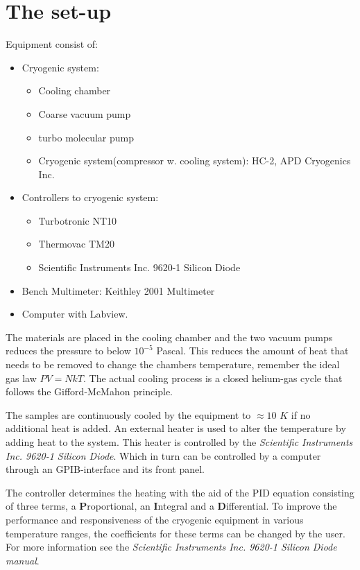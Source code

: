 \documentclass[a4paper,12pt]{article}
\begin{document}
\section{The set-up}
Equipment consist of:
\begin{itemize}
\item Cryogenic system:
\begin{itemize}
\item Cooling chamber
\item Coarse vacuum pump
\item turbo molecular pump
\item Cryogenic system(compressor w. cooling system): HC-2, APD Cryogenics Inc.
\end{itemize}
\item Controllers to cryogenic system: 
\begin{itemize}
\item Turbotronic NT10
\item Thermovac TM20
\item Scientific Instruments Inc. 9620-1 Silicon Diode
\end{itemize} 
\item Bench Multimeter: Keithley 2001 Multimeter
\item Computer with Labview.
\end{itemize}

The materials are placed in the cooling chamber and the two vacuum pumps reduces the pressure to below $10^{-5}$ Pascal. This reduces the amount of heat that needs to be removed to change the chambers temperature, remember the ideal gas law $PV=NkT$. The actual cooling process is a closed helium-gas cycle that follows the Gifford-McMahon principle.

The samples are continuously cooled by the equipment to $\approx 10$ $K$ if no additional heat is added. An external heater is used to alter the temperature by adding heat to the system. This heater is controlled by the \emph{Scientific Instruments Inc. 9620-1 Silicon Diode}. Which in turn can be controlled by a computer through an GPIB-interface and its front panel. 

The controller determines the heating with the aid of the PID equation consisting of three terms, a \textbf{P}roportional, an \textbf{I}ntegral and a \textbf{D}ifferential. To improve the performance and responsiveness of the cryogenic equipment in various temperature ranges, the coefficients for these terms can be changed by the user. For more information see the \emph{Scientific Instruments Inc. 9620-1 Silicon Diode manual}.
\end{document}
